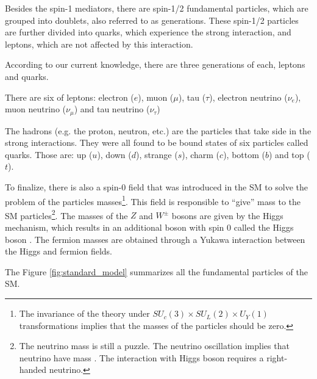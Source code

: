 Besides the spin-1 mediators, there are spin-1/2 fundamental particles, which are grouped into doublets, also referred to as generations. These spin-1/2 particles are further divided into quarks, which experience the strong interaction, and leptons, which are not affected by this interaction. 

According to our current knowledge, there are three generations of each, leptons and quarks. 

There are six of leptons: electron ($e$), muon ($\mu$), tau ($\tau$), electron neutrino ($\nu_e$), muon neutrino ($\nu_\mu$) and tau neutrino ($\nu_\tau$)

The hadrons (e.g. the proton, neutron, etc.) are the particles that take side in the strong interactions. They were all found to be bound states of six particles called quarks. Those are: up ($u$), down ($d$), strange ($s$), charm ($c$), bottom ($b$) and top ($t$).

To finalize, there is also a spin-0 field that was introduced in the SM to solve the problem of the particles masses\footnote{The invariance of the theory under $SU_c(3) \times SU_L(2) \times U_Y(1)$ transformations implies that the masses of the particles should be zero.}. This field is responsible to ``give'' mass to the SM particles\footnote{The neutrino mass is still a puzzle. The neutrino oscillation implies that neutrino have mass \cite{Pontecorvo:1957cp, Pontecorvo:1967fh, PhysRevLett.81.1562}. The interaction with Higgs boson requires a right-handed neutrino.}. The masses of the $Z$ and $W^\pm$ bosons are given by the Higgs mechanism, which results in an additional boson with spin 0 called the Higgs boson \cite{PhysRevLett.13.585, PhysRevLett.13.508, PhysRevLett.13.321}. The fermion masses are obtained through a Yukawa interaction between the Higgs and fermion fields.

The Figure \ref{fig:standard_model} summarizes all the fundamental particles of the SM.

